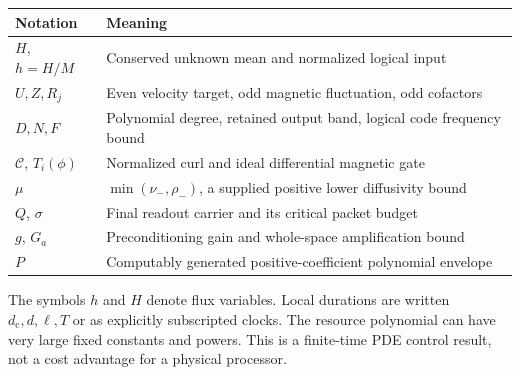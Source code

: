 \documentclass[11pt,a4paper]{amsart}
\theoremstyle{definition}
\theoremstyle{remark}
\numberwithin{equation}{section}
\begin{document}
\begin{center}\small
\begin{tabular}{@{}p{.22\linewidth}p{.70\linewidth}@{}}\toprule
Notation & Meaning\\\midrule
$H$, $h=H/M$ & Conserved unknown mean and normalized logical input\\
$U,Z,R_j$ & Even velocity target, odd magnetic fluctuation, odd cofactors\\
$D,N,F$ & Polynomial degree, retained output band, logical code frequency bound\\
$\mathscr C$, $T_i(\phi)$ & Normalized curl and ideal differential magnetic gate\\
$\mu$ & $\min(\nu_-,\rho_-)$, a supplied positive lower diffusivity bound\\
$Q$, $\sigma$ & Final readout carrier and its critical packet budget\\
$g$, $G_a$ & Preconditioning gain and whole-space amplification bound\\
$P$ & Computably generated positive-coefficient polynomial envelope\\
\bottomrule\end{tabular}\end{center}
The symbols $h$ and $H$ denote flux variables. Local durations are written
$d_{\mathrm c},d,\ell,T$ or as explicitly subscripted clocks. The resource
polynomial can have very large fixed constants and powers. This is a
finite-time PDE control result, not a cost advantage for a physical processor.
\end{document}

